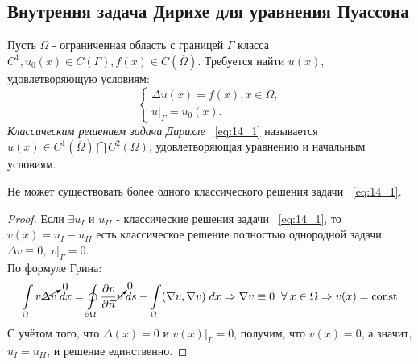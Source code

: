 \subsection{Внутрення задача Дирихе для уравнения Пуассона}
Пусть $\Omega$ - ограниченная область с границей $\Gamma$ класса $C^1, u_0(x) \in C(\Gamma), f(x) \in C(\overline{\Omega})$. Требуется найти $u(x)$, удовлетворяющую условиям:
\begin{equation}
\label{eq:14_1}
	\begin{cases}
		\Delta u(x) = f(x), x \in \Omega, \\
		u\bigr|_{\Gamma} = u_0(x).
	\end{cases}
\end{equation}
\textit{Классическим решением задачи Дирихле} ~\ref{eq:14_1} называется $u(x) \in C^1(\overline{\Omega}) \bigcap C^2({\Omega})$, удовлетворяющая уравнению и начальным условиям. \\
\begin{lemma}
Не может существовать более одного классического решения задачи ~\ref{eq:14_1}.
\end{lemma}
\begin{proof}
Если $\exists u_{I}$ и $u_{II}$ - классические решения задачи ~\ref{eq:14_1}, то $v(x) = u_{I} - u_{II}$ есть классическое решение полностью однородной задачи: $\Delta v \equiv 0,\; v\bigr|_{\Gamma} = 0$. \\
По формуле Грина:
\begin{equation*}
	\int\limits_{\Omega} v\cancelto{0}{\Delta v}\; dx = \oint\limits_{\partial \Omega}\dfrac{\partial v}{\partial \vec{n}}\cancelto{0}{v}\;ds - \int\limits_{\Omega}(\nabla v, \nabla v)\;dx \Rightarrow \nabla v \equiv 0 \;\;\forall\: x \in \Omega \Rightarrow v(x) = \text{const}
\end{equation*}
С учётом того, что $\Delta(x) = 0$ и $v(x)\bigr|_{\Gamma} = 0$, получим, что $v(x) = 0$, а значит, $u_{I} = u_{II}$, и решение единственно.
\end{proof}
